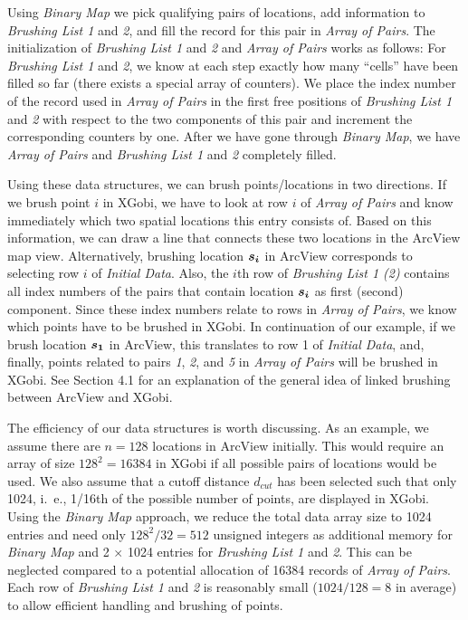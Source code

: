 Using {\it Binary Map} we pick qualifying pairs of locations, add information
to {\it Brushing List 1} and {\it 2}, and fill the record for this
pair in {\it Array of Pairs}. 
The initialization of {\it Brushing List 1} and {\it 2} and
{\it Array of Pairs} works as follows: 
For {\it Brushing List 1} and
{\it 2}, we know at each step exactly how 
many ``cells'' have been filled so far
(there exists a special array of counters). We place the
index number of the record used in {\it Array of Pairs}
in the first free positions of {\it Brushing List 1} 
and {\it 2} with respect to the two components of this pair
and increment the corresponding counters by one.  After
we have gone through {\it Binary Map}, we have {\it Array of Pairs}
and {\it Brushing List 1} and {\it 2} completely filled. 

Using these data structures, we can
brush points/locations in two directions. 
If we brush point $i$ in XGobi, we have to look at row $i$ of
{\it Array of Pairs} and know immediately which two spatial locations 
this entry consists of. Based on this information, we can 
draw a line that connects these two locations in the ArcView map view.
Alternatively, brushing location $\mbox{\boldmath$s_i$}$
in ArcView corresponds to selecting row $i$ of
{\it Initial Data}. Also,
the $i$th row of {\it Brushing List 1 (2)} contains all index numbers of
the pairs that contain location $\mbox{\boldmath$s_i$}$
as first (second) component. Since these index numbers relate
to rows in {\it Array of Pairs}, we know which points have to be 
brushed in XGobi. In continuation of our example, if we
brush location $\mbox{\boldmath$s_1$}$ in ArcView, this
translates to row 1 of
{\it Initial Data}, and, finally, points related to pairs {\it 1}, {\it 2},
and {\it 5} in {\it Array of Pairs} will be brushed in XGobi. 
See Section 4.1 for an
explanation of the general idea of linked brushing between
ArcView and XGobi.

The efficiency of our data structures is worth discussing. 
As an example, we assume there are $n = 128$ locations in ArcView initially. 
This would require an array of size $128^2 = 16384$ in XGobi if
all possible pairs of locations would be used.  
We also assume that a 
cutoff distance $d_{cut}$ has been selected such that only 1024, i.~e.,
1/16th of the possible number of points, are displayed in XGobi.
Using the {\it Binary Map} approach, we reduce the total
data array size to 1024 entries and need only 
$128^2 / 32 = 512$ unsigned integers as 
additional memory for {\it Binary Map} and 2 $\times$ 1024
entries for {\it Brushing List 1} and {\it 2}. 
This can be neglected compared to a potential
allocation of 16384 records of {\it Array of Pairs}. 
Each row of {\it Brushing List 1} and {\it 2} is reasonably
small ($1024 / 128 = 8$ in average) to allow efficient handling and
brushing of points.


